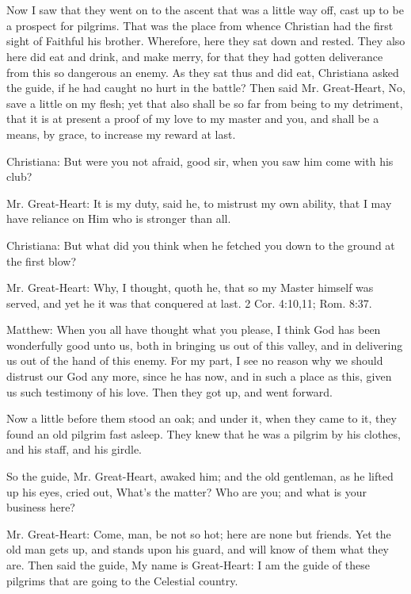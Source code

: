 \chapter[THE SIXTH STAGE]{}

Now I saw that they went on to the ascent that was a little way off, cast up to be a prospect for pilgrims. That was the place from whence Christian had the first sight of Faithful his brother. Wherefore, here they sat down and rested. They also here did eat and drink, and make merry, for that they had gotten deliverance from this so dangerous an enemy. As they sat thus and did eat, Christiana asked the guide, if he had caught no hurt in the battle? Then said Mr. Great-Heart, No, save a little on my flesh; yet that also shall be so far from being to my detriment, that it is at present a proof of my love to my master and you, and shall be a means, by grace, to increase my reward at last.

Christiana: But were you not afraid, good sir, when you saw him come with his club?

Mr. Great-Heart: It is my duty, said he, to mistrust my own ability, that I may have reliance on Him who is stronger than all.

Christiana: But what did you think when he fetched you down to the ground at the first blow?

Mr. Great-Heart: Why, I thought, quoth he, that so my Master himself was served, and yet he it was that conquered at last. 2 Cor. 4:10,11; Rom. 8:37.

Matthew: When you all have thought what you please, I think God has been wonderfully good unto us, both in bringing us out of this valley, and in delivering us out of the hand of this enemy. For my part, I see no reason why we should distrust our God any more, since he has now, and in such a place as this, given us such testimony of his love. Then they got up, and went forward.

Now a little before them stood an oak; and under it, when they came to it, they found an old pilgrim fast asleep. They knew that he was a pilgrim by his clothes, and his staff, and his girdle.

So the guide, Mr. Great-Heart, awaked him; and the old gentleman, as he lifted up his eyes, cried out, What's the matter? Who are you; and what is your business here?

Mr. Great-Heart: Come, man, be not so hot; here are none but friends. Yet the old man gets up, and stands upon his guard, and will know of them what they are. Then said the guide, My name is Great-Heart: I am the guide of these pilgrims that are going to the Celestial country.

